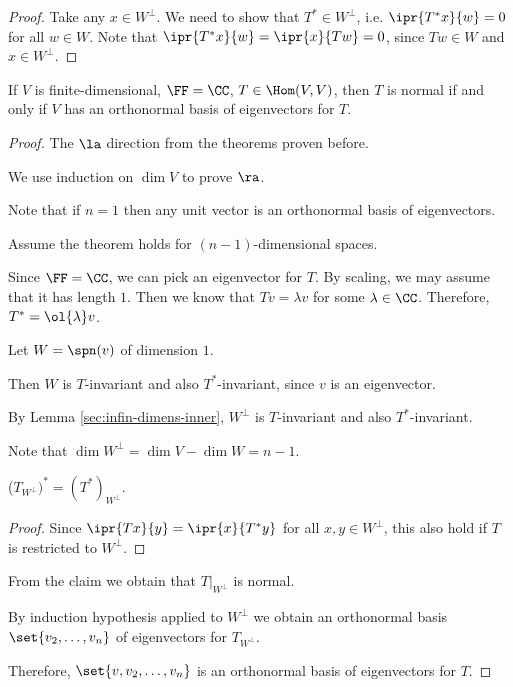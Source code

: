 \documentclass[11pt]{scrartcl}
\begin{document}
\begin{proof}
  Take any $x\in W^{\bot}$. We need to show that $T^{*}\in W^{\bot}$,
  i.e. $\ipr{T^{*}x}{w} = 0$ for all $w\in W$. Note that $\ipr{T^{*}x}{w} = \ipr{x}{Tw} = 0$, since $Tw \in W$ and $x\in W^{\bot}$.
\end{proof}
\begin{theorem}
  If $V$ is finite-dimensional, $\FF = \CC$, $T \in \Hom(V,V)$, then $T$ is normal if and only if $V$ has an orthonormal basis of eigenvectors for $T$.
\end{theorem}
\begin{proof}
  The $\la$ direction from the theorems proven before.

  We use induction on $\dim V$ to prove $\ra$.

  Note that if $n = 1$ then any unit vector is an orthonormal basis of eigenvectors.

  Assume the theorem holds for $(n-1)$-dimensional spaces.

  Since $\FF = \CC$, we can pick an eigenvector for $T$. By scaling, we may assume that it has length $1$. Then we know that $Tv = \lambda v$ for some $\lambda \in \CC$. Therefore, $T^{*} = \ol{\lambda} v$.

  Let $W = \spn(v)$ of dimension $1$.

  Then $W$ is $T$-invariant and also $T^{*}$-invariant, since $v$ is an eigenvector.

  By Lemma \ref{sec:infin-dimens-inner}, $W^{\bot}$ is $T$-invariant and also $T^{*}$-invariant.

  Note that $\dim W^{\bot} = \dim V - \dim W = n - 1$.

  \begin{claim*}
    ($T_{W^{\bot}})^{*} = (T^{*})_{W^{\bot}}$.
  \end{claim*}
  \begin{proof}
    Since $\ipr{Tx}{y}=\ipr{x}{T^{*}y}$ for all $x,y \in W^{\bot}$, this also hold if $T$ is restricted to $W^{\bot}$.
  \end{proof}

  From the claim we obtain that $T|_{W^{\bot}}$ is normal.
  
  By induction hypothesis applied to $W^{\bot}$ we obtain an
  orthonormal basis $\set{v_2, \dots, v_n}$ of eigenvectors for
  $T_{W^{\bot}}$.

  Therefore, $\set{v, v_2, \dots, v_n}$ is an orthonormal basis of eigenvectors for $T$.
\end{proof}
\end{document}
